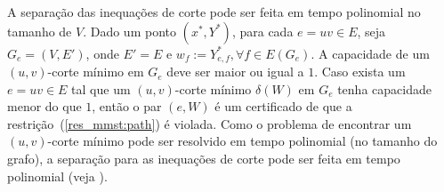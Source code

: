 A separação das inequações de corte %
pode ser feita em tempo polinomial no tamanho de $V$. 
Dado um ponto  $(x^*, Y^*)$,   %
para cada $e=uv \in E$, seja $G_{e} = (V, E')$, onde $E' = E$ e
$w_f:= Y^*_{e,f}, \forall f \in E(G_{e})$. A capacidade de um
$(u,v)$-corte mínimo em $G_{e}$ deve ser maior ou igual a $1$. Caso
exista um $e=uv \in E$ tal que um $(u,v)$-corte mínimo $\delta(W)$ em
$G_{e}$ tenha capacidade menor do que $1$, então o par $(e,W)$ é um
certificado de que a restrição~(\ref{res_mmst:path}) é violada. Como o
problema de encontrar um $(u,v)$-corte mínimo pode ser resolvido em
tempo polinomial (no tamanho do grafo), a 
separação para as inequações de corte pode ser feita em tempo polinomial
(veja \cite{KorteV2012}).
